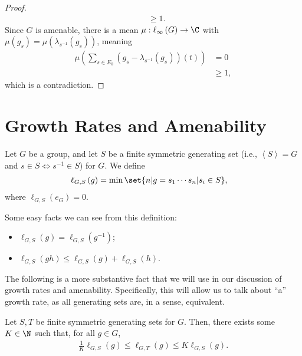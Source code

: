 \documentclass[10pt]{mypackage}
\begin{document}
\begin{proof}
\begin{align*}
                                                                                                                               &\geq 1.
  \end{align*}
  Since $G$ is amenable, there is a  mean $\mu: \ell_{\infty}\left(G\right)\rightarrow \C$ with $\mu\left(g_s\right) = \mu\left(\lambda_{s^{-1}}\left(g_s\right)\right)$, meaning
  \begin{align*}
    \mu\left(\sum_{s\in E_0}\left(g_s - \lambda_{s^{-1}}\left(g_s\right)\right)\left(t\right)\right) &= 0\\
                                                                                                     &\geq 1,
  \end{align*}
  which is a contradiction.
\end{proof}
\section{Growth Rates and Amenability}%
\begin{definition}
  Let $G$ be a group, and let $S$ be a finite symmetric generating set (i.e., $\left\langle S \right\rangle = G$ and $s\in S \Leftrightarrow s^{-1}\in S$) for $G$. We define
  \begin{align*}
    \ell_{G,S}\left(g\right) &= \min\set{n | g = s_1\cdots s_n | s_i\in S},
  \end{align*}
  where $\ell_{G,S}\left(e_G\right) = 0$.
\end{definition}
Some easy facts we can see from this definition:
\begin{itemize}
  \item $\ell_{G,S}\left(g\right) = \ell_{G,S}\left(g^{-1}\right)$;
  \item $\ell_{G,S}\left(gh\right) \leq \ell_{G,S}\left(g\right) + \ell_{G,S}\left(h\right)$.
\end{itemize}
The following is a more substantive fact that we will use in our discussion of growth rates and amenability. Specifically, this will allow us to talk about ``a'' growth rate, as all generating sets are, in a sense, equivalent.
\begin{fact}
  Let $S,T$ be finite symmetric generating sets for $G$. Then, there exists some $K\in \N$ such that, for all $g\in G$,
  \begin{align*}
    \frac{1}{K}\ell_{G,S}\left(g\right) \leq \ell_{G,T}\left(g\right) \leq K \ell_{G,S}\left(g\right).
  \end{align*}
\end{fact}
\end{document}
